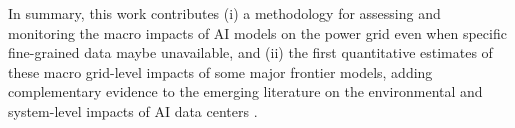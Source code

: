 \documentclass[sigconf,authordraft]{acmart}
\begin{document}
In summary, this work contributes (i) a methodology for assessing and monitoring the macro impacts of AI models on the power grid even when specific fine-grained data maybe unavailable, and (ii) the first quantitative estimates of these macro grid-level impacts of some major frontier models, adding complementary evidence to the emerging literature on the environmental and system-level impacts of AI data centers \cite{murino2023sustainable,guidi2024environmental,thangam2024impact}. 




\end{document}
